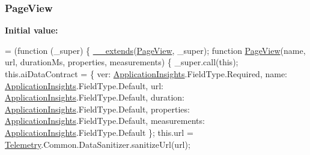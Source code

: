 \subsubsection[{\texorpdfstring{Page\+View}{PageView}}]{ Page\+View}\hypertarget{_scripts_2ai_80_822_89-build00167_8js_af1b38c443d0ea4ca3319b382ffb5f515}{}\label{_scripts_2ai_80_822_89-build00167_8js_af1b38c443d0ea4ca3319b382ffb5f515}
{\bfseries Initial value\+:}
\begin{DoxyCode}
= (\textcolor{keyword}{function} (\_super) \{
                \hyperlink{obj_2_release_2_package_2_package_tmp_2_scripts_2ai_80_822_89-build00167_8js_ac09f4951ac4b25df0272d4e78ff85ae0}{\_\_extends}(\hyperlink{obj_2_release_2_package_2_package_tmp_2_scripts_2ai_80_822_89-build00167_8js_af1b38c443d0ea4ca3319b382ffb5f515}{PageView}, \_super);
                \textcolor{keyword}{function} \hyperlink{obj_2_release_2_package_2_package_tmp_2_scripts_2ai_80_822_89-build00167_8js_af1b38c443d0ea4ca3319b382ffb5f515}{PageView}(name, url, durationMs, properties, measurements) \{
                    \_super.call(\textcolor{keyword}{this});
                    this.aiDataContract = \{
                        ver: \hyperlink{obj_2_release_2_package_2_package_tmp_2_scripts_2ai_80_822_89-build00167_8js_aa415ef4f8cdd699689ef4b61db7656d8}{ApplicationInsights}.FieldType.Required,
                        name: \hyperlink{obj_2_release_2_package_2_package_tmp_2_scripts_2ai_80_822_89-build00167_8js_aa415ef4f8cdd699689ef4b61db7656d8}{ApplicationInsights}.FieldType.Default,
                        url: \hyperlink{obj_2_release_2_package_2_package_tmp_2_scripts_2ai_80_822_89-build00167_8js_aa415ef4f8cdd699689ef4b61db7656d8}{ApplicationInsights}.FieldType.Default,
                        duration: \hyperlink{obj_2_release_2_package_2_package_tmp_2_scripts_2ai_80_822_89-build00167_8js_aa415ef4f8cdd699689ef4b61db7656d8}{ApplicationInsights}.FieldType.Default,
                        properties: \hyperlink{obj_2_release_2_package_2_package_tmp_2_scripts_2ai_80_822_89-build00167_8js_aa415ef4f8cdd699689ef4b61db7656d8}{ApplicationInsights}.FieldType.Default,
                        measurements: \hyperlink{obj_2_release_2_package_2_package_tmp_2_scripts_2ai_80_822_89-build00167_8js_aa415ef4f8cdd699689ef4b61db7656d8}{ApplicationInsights}.FieldType.Default
                    \};
                    this.url = \hyperlink{obj_2_release_2_package_2_package_tmp_2_scripts_2ai_80_822_89-build00167_8js_ae256f6f49305d910c46af8e5b9ef950f}{Telemetry}.Common.DataSanitizer.sanitizeUrl(url);

\end{DoxyCode}
